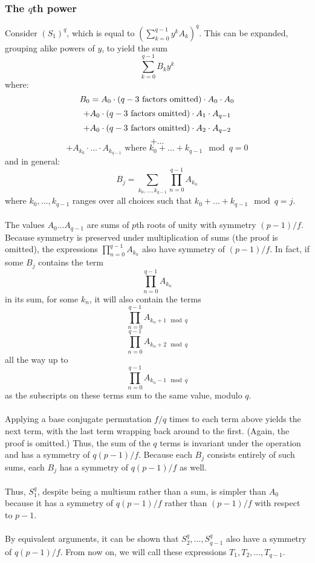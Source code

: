 \documentclass{article}
\begin{document}
\subsubsection{The $ q $th power}
    Consider $ (S_1)^q $, which is equal to $ (\sum_{k = 0}^{q - 1} y^k A_k)^q $. This can be expanded, grouping alike powers of $ y $, to yield the sum
    $$ \sum_{k = 0}^{q - 1} B_k y^k $$
    where:
    $$ B_0 = A_0 \cdot \text{($ q - 3 $ factors omitted)} \cdot A_0 \cdot A_0 $$
    $$ + A_0 \cdot \text{($ q - 3 $ factors omitted)} \cdot A_1 \cdot A_{q - 1} $$
    $$ + A_0 \cdot \text{($ q - 3 $ factors omitted)} \cdot A_2 \cdot A_{q - 2} $$
    $$ + \dots $$
    $$ + A_{k_0} \cdot \dots \cdot A_{k_{q - 1}} \text{ where } k_0 + \dots + k_{q - 1} \mod q = 0 $$
    and in general:
    $$ B_j = \sum_{k_0, \dots, k_{q - 1}} \prod_{n = 0}^{q - 1} A_{k_n} $$
    where $ k_0, \dots, k_{q - 1} $ ranges over all choices such that $ k_0 + \dots + k_{q - 1} \mod q = j $.\\
    \\
    The values $ A_0 \dots A_{q - 1} $ are sums of $ p $th roots of unity with symmetry $ (p - 1)/f $. Because symmetry is preserved under multiplication of sums (the proof is omitted), the expressions $ \prod_{n = 0}^{q - 1} A_{k_n} $ also have symmetry of $ (p - 1)/f $. In fact, if some $ B_j $ contains the term
    $$ \prod_{n = 0}^{q - 1} A_{k_n} $$
    in its sum, for some $ k_n $, it will also contain the terms
    $$ \prod_{n = 0}^{q - 1} A_{k_n + 1 \mod q} $$
    $$ \prod_{n = 0}^{q - 1} A_{k_n + 2 \mod q} $$
    all the way up to
    $$ \prod_{n = 0}^{q - 1} A_{k_n - 1 \mod q} $$
    as the subscripts on these terms sum to the same value, modulo $ q $.\\
    \\
    Applying a base conjugate permutation $ f/q $ times to each term above yields the next term, with the last term wrapping back around to the first. (Again, the proof is omitted.) Thus, the sum of the $ q $ terms is invariant under the operation and has a symmetry of $ q(p - 1)/f $. Because each $ B_j $ consists entirely of such sums, each $ B_j $ has a symmetry of $ q(p - 1)/f $ as well.\\
    \\
    Thus, $ S_1^q $, despite being a multisum rather than a sum, is simpler than $ A_0 $ because it has a symmetry of $ q(p - 1)/f $ rather than $ (p - 1)/f $ with respect to $ p - 1 $.\\
    \\
    By equivalent arguments, it can be shown that $ S_2^q, \dots, S_{q - 1}^q $ also have a symmetry of $ q(p - 1)/f $. From now on, we will call these expressions $ T_1, T_2, \dots, T_{q - 1} $.\\
\end{document}
